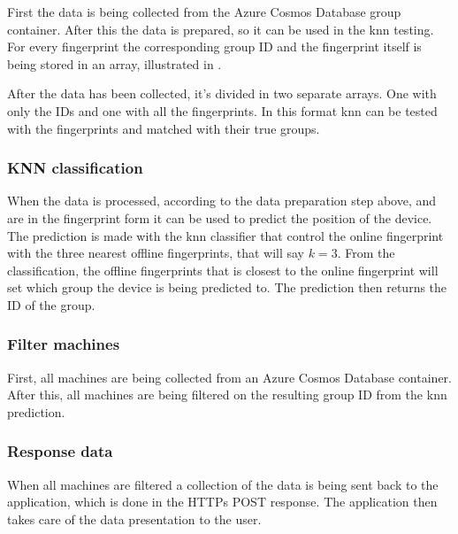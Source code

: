 
First the data is being collected from the Azure Cosmos Database group container. 
After this the data is prepared, so it can be used in the \acrshort{knn} testing.
For every fingerprint the corresponding group ID and the fingerprint itself is being stored in an array, illustrated in .


After the data has been collected, it's divided in two separate arrays.
One with only the IDs and one with all the fingerprints.
In this format \acrshort{knn} can be tested with the fingerprints and matched with their true groups.


\subsubsection{KNN classification}\label{sec:implServerSetPosKnnClassification}
When the data is processed, according to the data preparation step above, and are in the fingerprint form it can be used to predict the position of the device.
The prediction is made with the \acrshort{knn} classifier that control the online fingerprint with the three nearest offline fingerprints, that will say $k=3$.
From the classification, the offline fingerprints that is closest to the online fingerprint will set which group the device is being predicted to.
The prediction then returns the ID of the group.

\subsubsection{Filter machines}\label{sec:implServerSetPosFilterMachines}
First, all machines are being collected from an Azure Cosmos Database container.
After this, all machines are being filtered on the resulting group ID from the \acrshort{knn} prediction.

\subsubsection{Response data}\label{sec:implServerSetPosResponse}
When all machines are filtered a collection of the data is being sent back to the application, which is  done in the HTTPs POST response.
The application then takes care of the data presentation to the user. 

